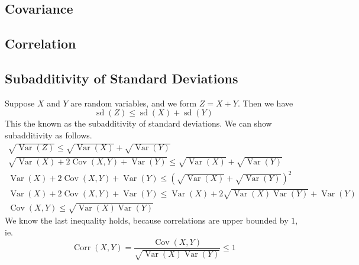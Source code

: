 \documentclass[11pt]{report} %
\begin{document}
\subsection{Covariance}

\subsection{Correlation}

\subsection{Subadditivity of Standard Deviations}

Suppose $X$ and $Y$ are random variables, and we form $Z = X + Y$. Then we have
\begin{equation}
\operatorname{sd}\left(Z\right) \leq \operatorname{sd}\left(X\right) + \operatorname{sd}\left(Y\right)
\end{equation}
This the known as the subadditivity of standard deviations. We can show subadditivity as follows. 
\begin{gather}
\sqrt{\operatorname{Var}\left(Z\right)} \leq \sqrt{\operatorname{Var}\left(X\right)} + \sqrt{\operatorname{Var}\left(Y\right)} \\
\sqrt{\operatorname{Var}\left(X\right) + 2\operatorname{Cov}\left(X, Y\right) +\operatorname{Var}\left(Y\right)} \leq \sqrt{\operatorname{Var}\left(X\right)} + \sqrt{\operatorname{Var}\left(Y\right)} \\
\operatorname{Var}\left(X\right) + 2\operatorname{Cov}\left(X, Y\right) +\operatorname{Var}\left(Y\right) \leq \left(\sqrt{\operatorname{Var}\left(X\right)} + \sqrt{\operatorname{Var}\left(Y\right)}\right)^{2} \\
\operatorname{Var}\left(X\right) + 2\operatorname{Cov}\left(X, Y\right) +\operatorname{Var}\left(Y\right) \leq \operatorname{Var}\left(X\right) + 2\sqrt{\operatorname{Var}\left(X\right)\operatorname{Var}\left(Y\right)}
+ \operatorname{Var}\left(Y\right) \\
\operatorname{Cov}\left(X, Y\right) \leq \sqrt{\operatorname{Var}\left(X\right)\operatorname{Var}\left(Y\right)}
\end{gather}
We know the last inequality holds, because correlations are upper bounded by $1$, ie.
\begin{equation}
\operatorname{Corr}\left(X, Y\right) = \dfrac{\operatorname{Cov}\left(X, Y\right)}{\sqrt{\operatorname{Var}\left(X\right)\operatorname{Var}\left(Y\right)}} \leq 1
\end{equation}
\end{document}
